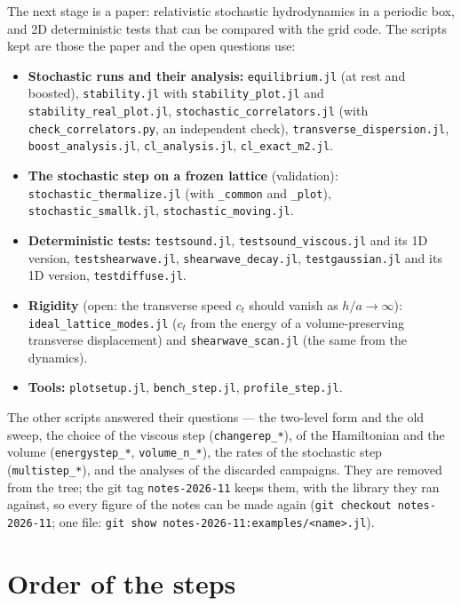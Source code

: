 \documentclass[11pt,aps,preprint,nofootinbib,superscriptaddress,tightenlines]{revtex4-2}
\newcommand{\file}[1]{\texttt{#1}}
\begin{document}
The next stage is a paper: relativistic stochastic hydrodynamics in a periodic box, and 2D
deterministic tests that can be compared with the grid code.  The scripts kept are those the
paper and the open questions use:
\begin{itemize}
\item \textbf{Stochastic runs and their analysis:} \file{equilibrium.jl} (at rest and boosted),
  \file{stability.jl} with \file{stability\_plot.jl} and \file{stability\_real\_plot.jl},
  \file{stochastic\_correlators.jl} (with \file{check\_correlators.py}, an independent check), \file{transverse\_dispersion.jl}, \file{boost\_analysis.jl},
  \file{cl\_analysis.jl}, \file{cl\_exact\_m2.jl}.
\item \textbf{The stochastic step on a frozen lattice} (validation):
  \file{stochastic\_thermalize.jl} (with \file{\_common} and \file{\_plot}),
  \file{stochastic\_smallk.jl}, \file{stochastic\_moving.jl}.
\item \textbf{Deterministic tests:} \file{testsound.jl}, \file{testsound\_viscous.jl} and its 1D
  version, \file{testshearwave.jl}, \file{shearwave\_decay.jl}, \file{testgaussian.jl} and its 1D
  version, \file{testdiffuse.jl}.
\item \textbf{Rigidity} (open: the transverse speed $c_t$ should vanish as $h/a\to\infty$):
  \file{ideal\_lattice\_modes.jl} ($c_t$ from the energy of a volume-preserving transverse
  displacement) and \file{shearwave\_scan.jl} (the same from the dynamics).
\item \textbf{Tools:} \file{plotsetup.jl}, \file{bench\_step.jl}, \file{profile\_step.jl}.
\end{itemize}
The other scripts answered their questions --- the two-level form and the old sweep, the
choice of the viscous step (\file{changerep\_*}), of the Hamiltonian and the volume
(\file{energystep\_*}, \file{volume\_n\_*}), the rates of the stochastic step
(\file{multistep\_*}), and the analyses of the discarded campaigns.  They are removed from the
tree; the git tag \file{notes-2026-11} keeps them, with the library they ran against, so every
figure of the notes can be made again (\file{git checkout notes-2026-11}; one file:
\file{git show notes-2026-11:examples/<name>.jl}).

\section{Order of the steps}
\label{sec:order}
\end{document}
